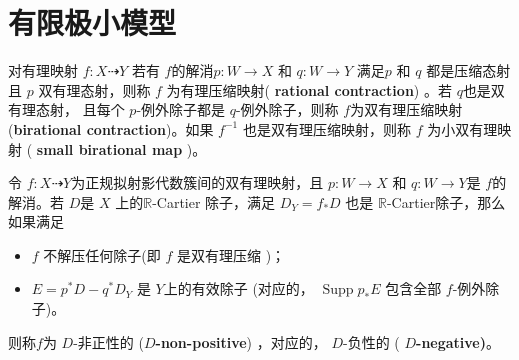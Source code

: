 \section{有限极小模型}

\begin{definition}
	\cite[\S 2]{haconSarkisovProgram2012} 对有理映射 $f:X\dashrightarrow Y$  若有 $f$的解消$p:W\to X$ 和 $q:W\to Y$ 满足$p$  和 $q$ 都是压缩态射且 $p$ 双有理态射，则称 $f$ 为有理压缩映射( \textbf{rational contraction})  。若 $ q$也是双有理态射， 且每个 $p$-例外除子都是 $q$-例外除子，则称 $f$为双有理压缩映射 (\textbf{birational contraction})。如果 $f^{-1}$ 也是双有理压缩映射，则称 $f$ 为小双有理映射   ( \textbf{small birational map} )。
\end{definition}

\begin{definition}\label{negativemap}
	\cite[Definition 3.6.1]{BCHM10}令 $f:X\dashrightarrow Y$为正规拟射影代数簇间的双有理映射，且 $p:W\to X$ 和 $q:W\to Y$是 $f$的解消。若 $D$是 $X$ 上的$\mathbb{R}$-Cartier 除子，满足  $D_{Y}=f_*D$ 也是 $\mathbb{R}$-Cartier除子，那么如果满足
	\begin{itemize}
		\item $f$ 不解压任何除子(即 $f$ 是双有理压缩 )；
		\item $E=p^{*}D-q^*D_Y$ 是  $Y$上的有效除子 (对应的， $\operatorname{Supp}p_*E$ 包含全部 $f$-例外除子)。
	\end{itemize}
 则称$f$为 $D$-非正性的  (\textbf{$D$-non-positive}) ，对应的， $D$-负性的 ( \textbf{$D$-negative)}。
\end{definition}


